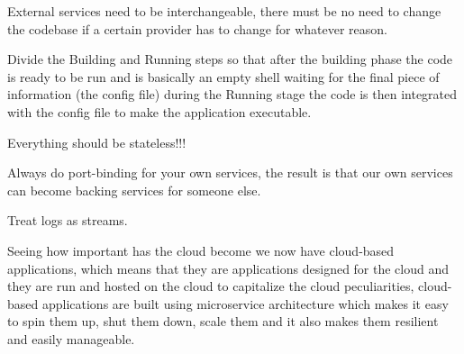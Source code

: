 External services need to be interchangeable, there must be no need to change the codebase if a
certain provider has to change for whatever reason.

Divide the Building and Running steps so that after the building phase the code is ready to be run
and is basically an empty shell waiting for the final piece of information (the config file) during
the Running stage the code is then integrated with the config file to make the application
executable.

Everything should be stateless!!!

Always do port-binding for your own services, the result is that our own services can become backing
services for someone else.

Treat logs as streams.

Seeing how important has the cloud become we now have cloud-based applications, which means that
they are applications designed for the cloud and they are run and hosted on the cloud to capitalize
the cloud peculiarities, cloud-based applications are built using microservice architecture which
makes it easy to spin them up, shut them down, scale them and it also makes them resilient and
easily manageable.



